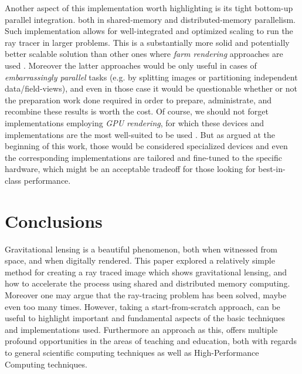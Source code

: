 Another aspect of this implementation worth highlighting is its tight bottom-up parallel integration.
both in shared-memory and distributed-memory parallelism. Such implementation
allows for well-integrated and optimized scaling to run the ray tracer in larger problems.
This is a substantially more solid and potentially better scalable solution than other ones
where \textit{farm rendering} approaches are used \cite{10.1145/3528223.3530171,app112412046}.
Moreover the latter approaches would be only useful in cases of \textit{embarrassingly parallel}
tasks (e.g. by splitting images or partitioning independent data/field-views),
and even in those case it would be questionable whether or not the preparation work done required in 
order to prepare, administrate, and recombine these results is worth the cost.
Of course, we should not forget implementations employing \textit{GPU rendering}, for which
these devices and implementations are the most well-suited to be used \cite{Peddie2019_hardware}.
But as argued at the beginning of this work, those would be considered specialized devices
and even the corresponding implementations are tailored and fine-tuned to the specific hardware,
which might be an acceptable tradeoff for those looking for best-in-class performance.



\section{Conclusions}
\label{sec:concl}

Gravitational lensing is a beautiful phenomenon, both when witnessed from space, and when digitally rendered.
This paper explored a relatively simple method for creating a ray traced image which shows gravitational lensing, and how to accelerate the process using shared and distributed memory computing.
Moreover one may argue that the ray-tracing problem has been solved, maybe even too many times.
However, taking a start-from-scratch approach, can be useful to highlight important and fundamental aspects of the basic techniques and implementations used.
Furthermore an approach as this, offers multiple profound opportunities in the areas of teaching and education, both with regards to general scientific computing techniques as well as High-Performance Computing techniques.

